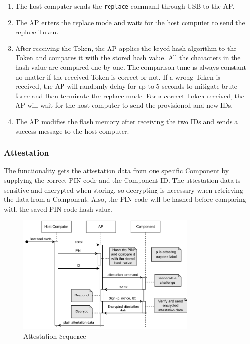 \documentclass[11pt,oneside,onecolumn,letterpaper]{article}
\newcounter{alg}
\begin{document}
	\begin{enumerate}
		\item The host computer sends the \texttt{replace} command through USB to the AP.
		\item The AP enters the replace mode and waits for the host computer to send the replace Token.
		\item After receiving the Token,
		the AP applies the keyed-hash algorithm to the Token and compares it with the stored hash value.
		All the characters in the hash value are compared one by one.
		The comparison time is always constant no matter if the received Token is correct or not.
		If a wrong Token is received,
		the AP will randomly delay for up to 5 seconds to mitigate brute force and then terminate the replace mode.
		For a correct Token received,
		the AP will wait for the host computer to send the provisioned and new IDs.
		\item The AP modifies the flash memory after receiving the two IDs and sends a success message to the host computer.
	\end{enumerate}
	
	\subsubsection{Attestation}
	The functionality gets the attestation data from one specific Component by supplying the correct PIN code and the Component ID.
	The attestation data is sensitive and encrypted when storing,
	so decrypting is necessary when retrieving the data from a Component.
	Also,
	the PIN code will be hashed before comparing with the saved PIN code hash value.
	
	\begin{figure}[h]
		\centering
		\includegraphics[width=0.8\textwidth]{pics/attest.pdf}
		\caption{Attestation Sequence}
		\label{fig:functionality_attest}
	\end{figure}
	
\end{document}
